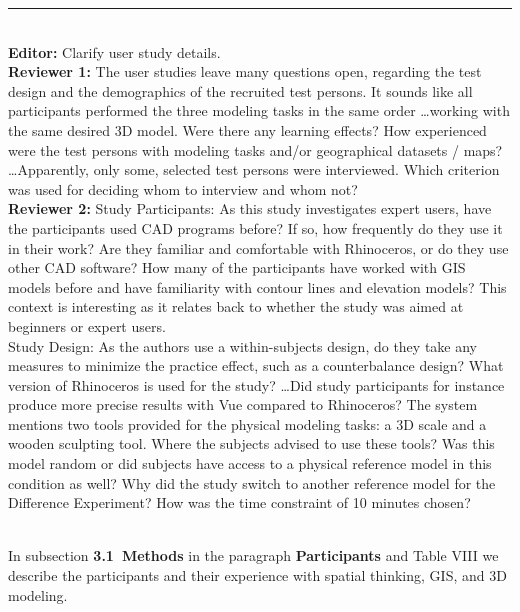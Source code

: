 \documentclass[prodmode,acmtochi]{acmsmall} %
\newcommand{\doublerule}[1][.4pt]{%
  \noindent
  \makebox[0pt][l]{\rule[.7ex]{\linewidth}{#1}}%
  \rule[.3ex]{\linewidth}{#1}}
\begin{document}
\doublerule\\

\textbf{Editor:} Clarify user study details. \\

\textbf{Reviewer 1:} The user studies leave many questions open, regarding the test design and the demographics of the recruited test persons. It sounds like all participants performed the three modeling tasks in the same order \ldots working with the same desired 3D model. Were there any learning effects? How experienced were the test persons with modeling tasks and/or geographical datasets / maps? \ldots Apparently, only some, selected test persons were interviewed. Which criterion was used for deciding whom to interview and whom not?\\

\textbf{Reviewer 2:}
Study Participants:
As this study investigates expert users, have the participants used CAD programs before? If so, how frequently do they use it in their work? Are they familiar and comfortable with Rhinoceros, or do they use other CAD software? How many of the participants have worked with GIS models before and have familiarity with contour lines and elevation models? This context is interesting as it relates back to whether the study was aimed at beginners or expert users.\\

Study Design:
As the authors use a within-subjects design, do they take any measures to minimize the practice effect, such as a counterbalance design?
What version of Rhinoceros is used for the study? \ldots Did study participants for instance produce more precise results with Vue compared to Rhinoceros?
The system mentions two tools provided for the physical modeling tasks: a 3D scale and a wooden sculpting tool.  Where the subjects advised to use these tools? 
Was this model random or did subjects have access to a physical reference model in this condition as well?
Why did the study switch to another reference model for the Difference Experiment?
How was the time constraint of 10 minutes chosen? \\

\clearpage

\hrulefill \\

In subsection \textbf{3.1~Methods}
in the paragraph \textbf{Participants} and Table VIII
we describe the participants 
and their experience with spatial thinking, GIS, and 3D modeling. \\
\end{document}

